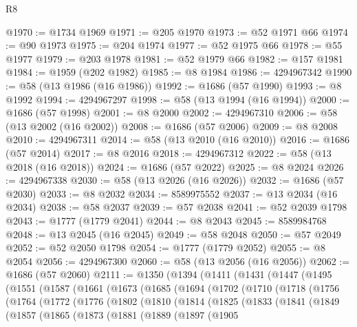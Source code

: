 \begin{lexlean}{R8}
\begin{coremodule}
@1970 := @1734 @1969
@1971 := @205 @1970
@1973 := @52 @1971 @66
@1974 := @90 @1973
@1975 := @204 @1974
@1977 := @52 @1975 @66
@1978 := @55 @1977
@1979 := @203 @1978
@1981 := @52 @1979 @66
@1982 := @157 @1981
@1984 := @1959 (@202 @1982)
@1985 := @8 @1984
@1986 := 4294967342
@1990 := @58 (@13 @1986 (@16 @1986))
@1992 := @1686 (@57 @1990)
@1993 := @8 @1992
@1994 := 4294967297
@1998 := @58 (@13 @1994 (@16 @1994))
@2000 := @1686 (@57 @1998)
@2001 := @8 @2000
@2002 := 4294967310
@2006 := @58 (@13 @2002 (@16 @2002))
@2008 := @1686 (@57 @2006)
@2009 := @8 @2008
@2010 := 4294967311
@2014 := @58 (@13 @2010 (@16 @2010))
@2016 := @1686 (@57 @2014)
@2017 := @8 @2016
@2018 := 4294967312
@2022 := @58 (@13 @2018 (@16 @2018))
@2024 := @1686 (@57 @2022)
@2025 := @8 @2024
@2026 := 4294967338
@2030 := @58 (@13 @2026 (@16 @2026))
@2032 := @1686 (@57 @2030)
@2033 := @8 @2032
@2034 := 8589975552
@2037 := @13 @2034 (@16 @2034)
@2038 := @58 @2037
@2039 := @57 @2038
@2041 := @52 @2039 @1798
@2043 := @1777 (@1779 @2041)
@2044 := @8 @2043
@2045 := 8589984768
@2048 := @13 @2045 (@16 @2045)
@2049 := @58 @2048
@2050 := @57 @2049
@2052 := @52 @2050 @1798
@2054 := @1777 (@1779 @2052)
@2055 := @8 @2054
@2056 := 4294967300
@2060 := @58 (@13 @2056 (@16 @2056))
@2062 := @1686 (@57 @2060)
@2111 := @1350
    (@1394
      (@1411
        (@1431
          (@1447
            (@1495
              (@1551
                (@1587
                  (@1661
                    (@1673
                      (@1685
                        (@1694
                          (@1702
                            (@1710
                              (@1718
                                (@1756
                                  (@1764
                                    (@1772
                                      (@1776
                                        (@1802
                                          (@1810
                                            (@1814
                                              (@1825
                                                (@1833
                                                  (@1841
                                                    (@1849
                                                      (@1857
                                                        (@1865
                                                          (@1873
                                                            (@1881
                                                              (@1889
                                                                (@1897
                                                                  (@1905

\end{coremodule}
\end{lexlean}
